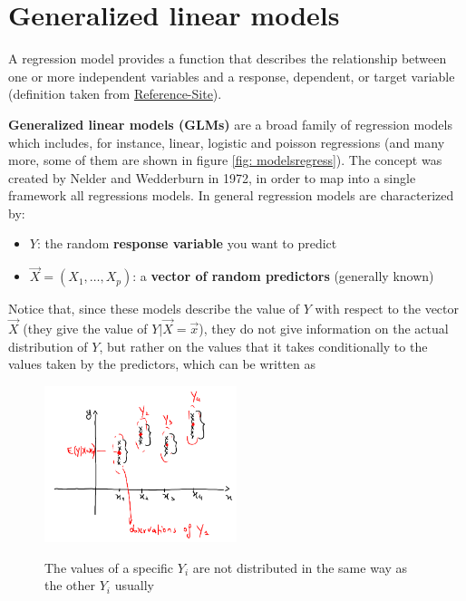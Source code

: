 \graphicspath{{chapters/images/0204/}}

\chapter{Generalized linear models}


\begin{definition} \label{def: RegModel} A regression model provides a function
  that describes the relationship between one or more independent variables and
  a response, dependent, or target variable (definition taken from
  \href{https://www.imsl.com/blog/what-is-regression-model}{Reference-Site}).
\end{definition}

  \textbf{Generalized linear models (GLMs)} are a broad family of regression
  models which includes, for instance, linear, logistic and poisson regressions
  (and many more, some of them are shown in figure \ref{fig: modelsregress}).
  The concept was created by Nelder and Wedderburn in 1972, in order to map into
  a single framework all regressions models. In general regression models are
  characterized by:
  \begin{itemize}
    \item $Y$: the random \textbf{response variable} you want to predict
    \item $\vec{X}=(X_1, \dots, X_p)$: a \textbf{vector of random predictors}
    (generally known)
  \end{itemize}
  Notice that, since these models describe the value of $Y$ with respect to the
  vector $\vec{X}$ (they give the value of $Y|\vec{X}=\vec{x}$), they do not
  give information on the actual distribution of $Y$, but rather on the values
  that it takes conditionally to the values taken by the predictors, which can
  be written as

  \begin{figure}[H]
    \caption{The values of a specific $Y_i$ are not distributed in the same way as the other $Y_i$ usually}
    \centering
    \includegraphics[width=0.5\textwidth]{GeneralizedLinModels}
    \label{fig: diffdistrib}
    \end{figure}

